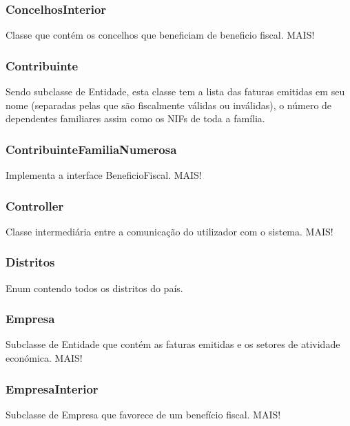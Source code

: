 \documentclass[a4paper]{article}
\begin{document}
\subsubsection{ConcelhosInterior} %

Classe que contém os concelhos que beneficiam de beneficio fiscal. MAIS!


\subsubsection{Contribuinte} %

Sendo subclasse de Entidade, esta classe tem a lista das faturas emitidas em seu nome (separadas pelas que são 
fiscalmente válidas ou inválidas), o número de dependentes familiares assim como os NIFs de toda a família.


\subsubsection{ContribuinteFamiliaNumerosa} %

Implementa a interface BeneficioFiscal. MAIS!


\subsubsection{Controller} %

Classe intermediária entre a comunicação do utilizador com o sistema. MAIS! 


\subsubsection{Distritos} %

Enum contendo todos os distritos do país.


\subsubsection{Empresa} %

Subclasse de Entidade que contém as faturas emitidas e os setores de atividade económica. MAIS!



\subsubsection{EmpresaInterior} %

Subclasse de Empresa que favorece de um benefício fiscal. MAIS! 
\end{document}

